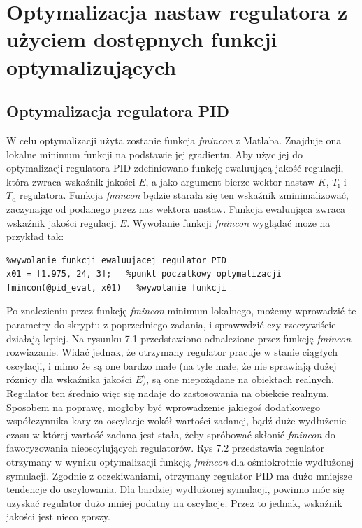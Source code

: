 \chapter{Optymalizacja nastaw regulatora z użyciem dostępnych funkcji optymalizujących}
\section{Optymalizacja regulatora PID}


W  celu optymalizacji użyta zostanie funkcja \emph{fmincon} z Matlaba. Znajduje ona lokalne minimum funkcji na podstawie jej gradientu. Aby użyc jej do optymalizacji regulatora PID zdefiniowano funkcję ewaluującą jakość regulacji, która zwraca wskaźnik jakości $E$, a jako argument bierze wektor nastaw $K$, $T_{\mathrm{i}}$ i $T_{\mathrm{d}}$ regulatora. Funkcja \emph{fmincon} będzie starała się ten wskaźnik zminimalizować, zaczynając od podanego przez nas wektora nastaw. Funkcja ewaluująca zwraca wskaźnik jakości regulacji $E$. Wywołanie funkcji \emph{fmincon} wyglądać może na przykład tak:

\begin{lstlisting}
%wywolanie funkcji ewaluujacej regulator PID
x01 = [1.975, 24, 3];   %punkt poczatkowy optymalizacji
fmincon(@pid_eval, x01)   %wywolanie funkcji
\end{lstlisting}

Po znalezieniu przez funkcję \emph{fmincon} minimum lokalnego, możemy wprowadzić te parametry do skryptu z poprzedniego zadania, i sprawwdzić czy rzeczywiście działają lepiej. Na rysunku 7.1 przedstawiono odnalezione przez funkcję \emph{fmincon} rozwiazanie. Widać jednak, że otrzymany regulator pracuje w stanie ciągłych oscylacji, i mimo że są one bardzo małe (na tyle małe, że nie sprawiają dużej różnicy dla wskaźnika jakości $E$), są one niepożądane na obiektach realnych. Regulator ten średnio więc się nadaje do zastosowania na obiekcie realnym. Sposobem na poprawę, mogłoby być wprowadzenie jakiegoś dodatkowego współczynnika kary za oscylacje wokół wartości zadanej, bądź duże wydłużenie czasu w której wartość zadana jest stała, żeby spróbować skłonić \emph{fmincon} do faworyzowania nieoscylujących regulatorów. Rys 7.2 przedstawia regulator otrzymany w wyniku optymalizacji funkcją \emph{fmincon} dla ośmiokrotnie wydłużonej symulacji. Zgodnie z oczekiwaniami, otrzymany regulator PID ma dużo mniejsze tendencje do oscylowania. Dla bardziej wydłużonej symulacji, powinno móc się uzyskać regulator dużo mniej podatny na oscylacje. Przez to jednak, wskaźnik jakości jest nieco gorszy.


